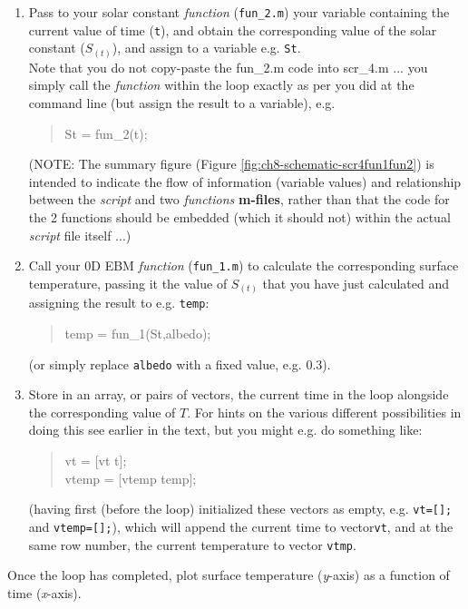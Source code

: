 \documentclass{tufte-book} %
\newenvironment{docspec}{\begin{quotation}\ttfamily\parskip0pt\parindent0pt\ignorespaces}{\end{quotation}}
\begin{document}
\begin{enumerate}[noitemsep]
\setlength{\itemindent}{.2in}
\vspace{1mm}
\item Pass to your solar constant \textit{function} (\texttt{fun\_2.m}) your  variable containing the current value of time (\texttt{t}), and obtain the corresponding value of the solar constant (\(S_{(t)}\)), and assign to a variable e.g. \texttt{St}.
\vspace{1mm}
\\Note that you do not copy-paste the \textsf{fun\_2.m} code into \textsf{scr\_4.m} ... you simply call the \textit{function} within the loop exactly as per you did at the command line (but assign the result to a variable), e.g.
\begin{docspec}
St = fun\_2(t);
\end{docspec}
(NOTE: The summary figure (Figure \ref{fig:ch8-schematic-scr4fun1fun2}) is intended to indicate the flow of information (variable values) and relationship between the \textit{script} and two \textit{functions} \textbf{m-files}, rather than that the code for the 2 functions should be embedded (which it should not) within the actual \textit{script} file itself ...)
\vspace{1mm}
\item  Call your \(0\)D EBM \textit{function} (\texttt{fun\_1.m}) to calculate the corresponding surface temperature, passing it the value of \(S_{(t)}\) that you have just calculated and assigning the result to  e.g. \texttt{temp}:
\begin{docspec}
temp = fun\_1(St,albedo);
\end{docspec}
(or simply replace \texttt{albedo} with a fixed value, e.g. 0.3).
\vspace{1mm}
\item Store in an array, or pairs of vectors, the current time in the loop alongside the corresponding value of \(T\). For hints on the various different possibilities in doing this see earlier in the text, but you might e.g. do something like:
\begin{docspec}
vt = [vt t];\\
vtemp = [vtemp temp];
\end{docspec}
(having first (before the loop) initialized these vectors as empty, e.g. \texttt{vt=[];} and \texttt{vtemp=[];}), which will append the current time to  vector\texttt{vt}, and at the same row number, the current temperature to vector \texttt{vtmp}.
\end{enumerate}
\vspace{-1mm}
Once the loop has completed, plot surface temperature (\textit{y}-axis) as a function of time (\textit{x}-axis).
\end{document}
